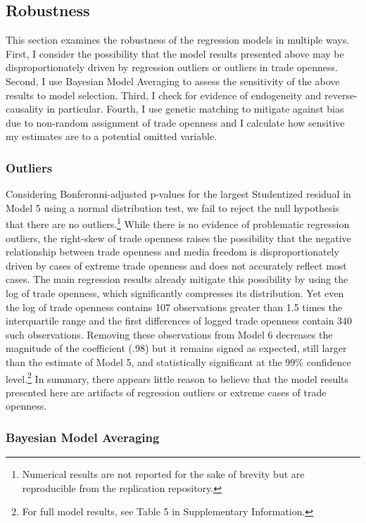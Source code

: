 \documentclass[12pt,a4paper]{article}\usepackage[]{graphicx}\usepackage[]{color}
\begin{document}
\subsection{Robustness}

This section examines the robustness of the regression models in multiple ways. First, I consider the possibility that the model results presented above may be disproportionately driven by regression outliers or outliers in trade openness. Second, I use Bayesian Model Averaging to assess the sensitivity of the above results to model selection. Third, I check for evidence of endogeneity and reverse-causality in particular. Fourth, I use genetic matching to mitigate against bias due to non-random assignment of trade openness and I calculate how sensitive my estimates are to a potential omitted variable.

\subsubsection{Outliers}

Considering Bonferonni-adjusted p-values for the largest Studentized residual in Model 5 using a normal distribution test, we fail to reject the null hypothesis that there are no outliers.\footnote{Numerical results are not reported for the sake of brevity but are reproducible from the replication repository.} While there is no evidence of problematic regression outliers, the right-skew of trade openness raises the possibility that the negative relationship between trade openness and media freedom is disproportionately driven by cases of extreme trade openness and does not accurately reflect most cases. The main regression results already mitigate this possibility by using the log of trade openness, which significantly compresses its distribution. Yet even the log of trade openness contains 107 observations greater than 1.5 times the interquartile range and the first differences of logged trade openness contain 340 such observations. Removing these observations from Model 6 decreases the magnitude of the coefficient (.98) but it remains signed as expected, still larger than the estimate of Model 5, and statistically significant at the 99\% confidence level.\footnote{For full model results, see Table 5 in Supplementary Information.} In summary, there appears little reason to believe that the model results presented here are artifacts of regression outliers or extreme cases of trade openness.

\subsubsection{Bayesian Model Averaging}
\end{document}
